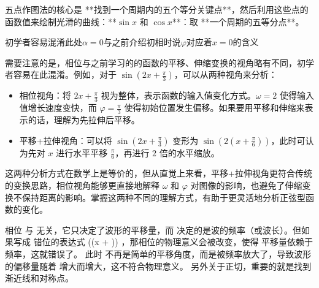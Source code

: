 五点作图法的核心是 **找到一个周期内的五个等分关键点**，然后利用这些点的函数值来绘制光滑的曲线：**$\sin x$ 和 $\cos x$**：取 **一个周期的五等分点**。

初学者容易混淆此处$\alpha=0$与之前介绍初相时说$\varphi$对应着$x=0$的含义


需要注意的是，相位与之前学习的的函数的平移、伸缩变换的视角略有不同，初学者容易在此混淆。例如，对于 $\displaystyle\sin(2x + \frac{\pi}{3})$，可以从两种视角来分析：
\begin{itemize}
\item 相位视角：将 $\displaystyle2x + \frac{\pi}{3}$ 视为整体，表示函数的输入值变化方式。$\omega = 2$ 使得输入值增长速度变快，而 $\displaystyle\varphi = \frac{\pi}{3}$ 使得初始位置发生偏移。如果要用平移和伸缩来表示的话，理解为先拉伸后平移。
\item 平移+拉伸视角：可以将 $\displaystyle\sin(2x + \frac{\pi}{3})$ 变形为 $\displaystyle\sin\left(2(x + \frac{\pi}{6})\right)$，此时可认为先对 $x$ 进行水平平移 $\displaystyle\frac{\pi}{6}$，再进行 $2$ 倍的水平缩放。
\end{itemize}

这两种分析方式在数学上是等价的，但从直觉上来看，平移+拉伸视角更符合传统的变换思路，相位视角能够更直接地解释 $\omega$ 和 $\varphi$ 对图像的影响，也避免了伸缩变换不保持距离的影响。掌握这两种不同的理解方式，有助于更灵活地分析正弦型函数的变化。

相位  \phi  与  \omega  无关，它只决定了波形的平移量，而  \omega  决定的是波的频率（或波长）。但如果写成 错位的表达式  \sin(\omega(x + \phi)) ，那相位的物理意义会被改变，使得 平移量依赖于频率，这就错误了。
此时  \phi  不再是简单的平移角度，而是被频率放大了，导致波形的偏移量随着  \omega  增大而增大，这不符合物理意义。
另外关于正切，重要的就是找到渐近线和对称点。